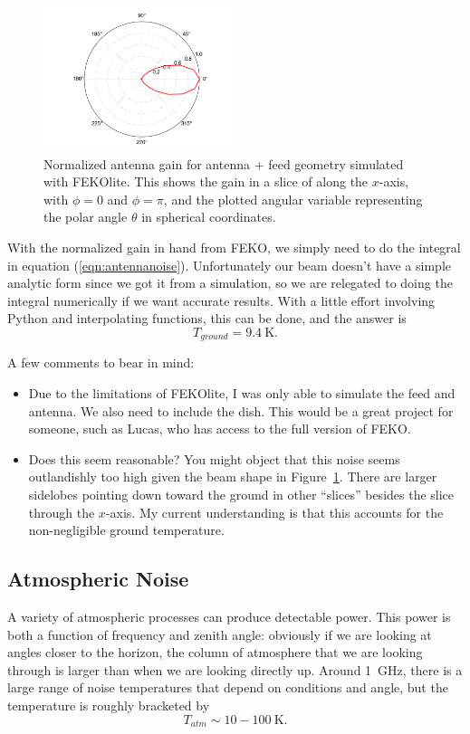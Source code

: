 \documentclass[11pt]{amsart}
\begin{document}
\begin{figure}
\begin{center}
\includegraphics[width=0.5\textwidth]{figures/coffeecan_normalizedgain.png}
\end{center}
\caption{Normalized antenna gain for antenna + feed geometry simulated with FEKOlite. This shows the gain in a slice of along the $x$-axis, with $\phi=0$ and $\phi=\pi$, and the plotted angular variable representing the polar angle $\theta$ in spherical coordinates. \label{fig:normalizedgain}}
\end{figure}

With the normalized gain in hand from FEKO, we simply need to do the integral in equation (\ref{eqn:antennanoise}). Unfortunately our beam doesn't have a simple analytic form since we got it from a simulation, so we are relegated to doing the integral numerically if we want accurate results. With a little effort involving Python and interpolating functions, this can be done, and the answer is
\begin{equation}
T_{ground} = 9.4~\textrm{K}.
\end{equation}

A few comments to bear in mind:
\begin{itemize}
\item Due to the limitations of FEKOlite, I was only able to simulate the feed and antenna. We also need to include the dish. This would be a great project for someone, such as Lucas, who has access to the full version of FEKO.
\item Does this seem reasonable? You might object that this noise seems outlandishly too high given the beam shape in Figure~\ref{fig:normalizedgain}. There are larger sidelobes pointing down toward the ground in other ``slices'' besides the slice through the $x$-axis. My current understanding is that this accounts for the non-negligible ground temperature.
\end{itemize}

\subsection{Atmospheric Noise}
A variety of atmospheric processes can produce detectable power. This power is both a function of frequency and zenith angle: obviously if we are looking at angles closer to the horizon, the column of atmosphere that we are looking through is larger than when we are looking directly up. Around 1~GHz, there is a  large range of noise temperatures that depend on conditions and angle, but the temperature is roughly bracketed by
\begin{equation}
T_{atm} \sim 10-100~\textrm{K}.
\end{equation}
\end{document}
